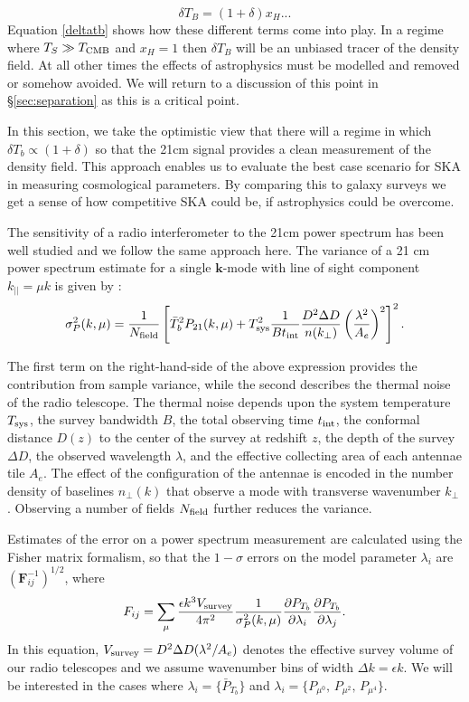 \documentclass{PoS}
\begin{document}
\begin{equation}\label{deltatb}
\delta T_B=(1+\delta)x_H...
\end{equation}
Equation \ref{deltatb} shows how these different terms come into play. In a regime where $T_S\gg T_{\rm CMB}$ and $x_H=1$ then $\delta T_B$ will be an unbiased tracer of the density field. At all other times the effects of astrophysics must be modelled and removed or somehow avoided. We will return to a discussion of this point in \S\ref{sec:separation} as this is a critical point.

In this section, we take the optimistic view that there will a regime in which $\delta T_b\propto(1+\delta)$ so that the 21cm signal provides a clean measurement of the density field. This approach enables us to evaluate the best case scenario for SKA in measuring cosmological parameters. By comparing this to galaxy surveys we get a sense of how competitive SKA could be, if astrophysics could be overcome.

The sensitivity of a radio interferometer to the 21cm power spectrum has been well studied \cite{bowman2005, mcquinn2006,mao20??} and we follow the same approach here. The variance of a 21 cm power spectrum estimate for a single
$\mathbf{k}$-mode with line of sight component $k_{||}=\mu k$ is given by
\cite{lidz2007}:
\begin{equation}
\sigma_P^2(k,\mu)= \frac{1}{N_{\rm field}}\left[\bar{T}_b^2P_{21}(k,\mu)+T_{\rm sys}^2\frac{1}{B t_{\rm int}}\frac{D^2\Delta D}{n(k_\perp)}\left(\frac{\lambda^2}{A_e}\right)^2\right]^2.
\end{equation}

The first term on the right-hand-side
of the above expression provides the contribution from sample variance,
while the second describes the thermal noise of the radio telescope.  The
thermal noise depends upon the system temperature $T_{\rm sys}$, the survey
bandwidth $B$, the total observing time $t_{\rm int}$, the conformal
distance $D(z)$ to the center of the survey at redshift $z$, the depth of
the survey $\Delta D$, the observed wavelength $\lambda$, and the effective
collecting area of each antennae tile $A_e$.  The effect of the
configuration of the antennae is encoded in the number density of baselines
$n_\perp(k)$ that observe a mode with transverse wavenumber $k_\perp$
\cite{mcquinn2005}.  Observing a number of fields $N_{\rm field}$ further reduces the variance.

Estimates of the error on a power spectrum measurement are calculated using the Fisher matrix formalism, so that the $1-\sigma$ errors on the model parameter $\lambda_i$ are $(\mathbf{F}_{ij}^{-1})^{1/2}$, where 
\begin{equation}
F_{ij}=\sum_{\rm \mu} \frac{\epsilon k^3 V_{\rm survey}}{4\pi^2}\frac{1}{\sigma_P^2(k,\mu)}\frac{\partial P_{T_b}}{\partial \lambda_i}\frac{\partial P_{T_b}}{\partial \lambda_j}.
\end{equation}
In this equation, $V_{\rm survey}=D^2\Delta D(\lambda^2/A_e)$ denotes the
effective survey volume of our radio telescopes and we assume wavenumber
bins of width $\Delta k=\epsilon k$.  We will be interested in the cases
where $\lambda_i=\{\bar{P}_{T_b}\}$ and $\lambda_i=\{
P_{\mu^0},\,P_{\mu^2},\,P_{\mu^4}\}$.
\end{document}
